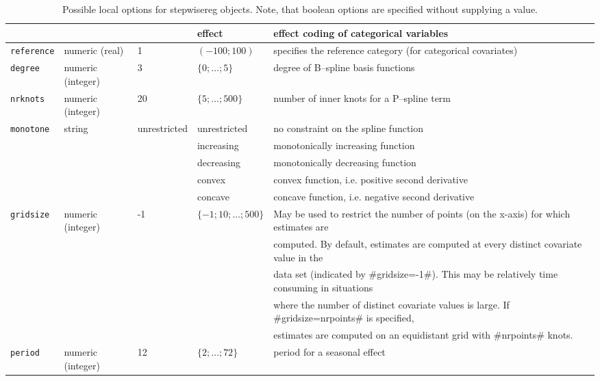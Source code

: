 \begin{sidewaystable}[ht]
\begin{center}
\begin{tabular}{|l|l|l|l|l|}
                 &                         &       & effect & effect coding of categorical variables \\
\hline
 {\tt reference} & numeric (real)    & 1  & $(-100;100)$ & specifies the reference category (for categorical covariates) \\
\hline
 {\tt degree}    & numeric (integer) & 3  & $\{0;\ldots;5\}$ & degree of B--spline basis functions \\
\hline
 {\tt nrknots}   & numeric (integer) & 20 & $\{5;\ldots;500\}$ & number of inner knots for a P--spline term \\
\hline
 {\tt monotone}  & string                  & unrestricted & unrestricted & no constraint on the spline function \\
                 &                         &              & increasing   & monotonically increasing function \\
                 &                         &              & decreasing   & monotonically decreasing function \\
                 &                         &              & convex       & convex function, i.e. positive second derivative \\
                 &                         &              & concave      & concave function, i.e. negative second derivative \\
\hline
 {\tt gridsize}  & numeric (integer) & -1 & $\{-1;10;\ldots;500\}$ & May be used to restrict the
number of points (on the x-axis) for which estimates are \\
& & & &  computed. By default, estimates are computed at every distinct covariate
value in the  \\
& & & & data set (indicated by #gridsize=-1#). This may be
relatively time consuming in situations  \\
& & & & where the number of
distinct covariate values is large. If #gridsize=nrpoints# is
specified,  \\
& & & & estimates are computed on an equidistant grid with #nrpoints# knots.\\
\hline
 {\tt period}    & numeric (integer) & 12 & $\{2;\ldots;72\}$ & period for a seasonal effect \\
 \hline
 \end{tabular}
 {\em\caption {\label{stepwisereg_localoptions} Possible local options
 for stepwisereg objects. Note, that boolean options are specified without supplying a value.}}
 \end{center}
 \end{sidewaystable}

